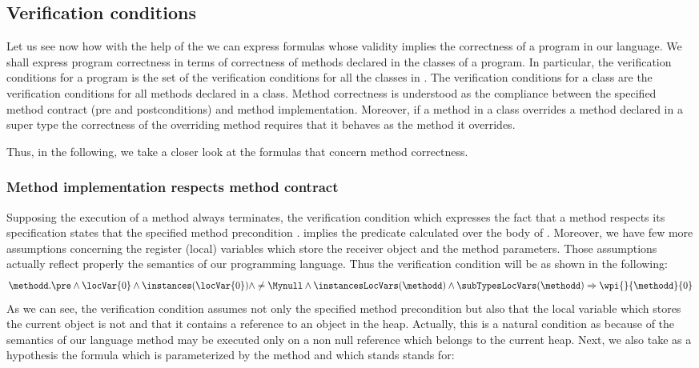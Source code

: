 

\subsection{Verification conditions} \label{wp:vcMeth}
Let us see now how with the help of the \wpName{} we can express 
formulas whose validity implies the correctness of a program in our language.
We shall express program correctness in terms of correctness of
methods declared in the classes of a program. 
In particular, the verification conditions  for a program  is the set of 
 the verification conditions for all the classes in \Program{}.
The verification conditions for a class are the verification conditions for
all methods declared in a class. 
Method correctness is understood 
as the compliance between the specified method contract (pre and
postconditions) and method implementation. 
Moreover, if a method in a class overrides a method declared in a super type
the correctness of the overriding method requires that it behaves as the
method it overrides. 

Thus, in the following, we take a closer look at
 the formulas that concern method correctness.

\subsubsection{Method implementation respects method contract}
Supposing the execution of a method always terminates, the verification condition which expresses the fact that 
 a method \methodd{}  respects its specification 
states that the specified method precondition  \methodd.\pre{} implies the
 predicate   calculated over the body of
 \methodd{}. Moreover,  we have few more assumptions concerning the register (local) variables
 which store the receiver object and the method parameters. Those assumptions
 actually reflect properly the semantics of our programming language. Thus the
 verification condition  will be as shown in the following: %
 $$ \methodd.\pre  \wedge \locVar{0} \wedge \instances( \locVar{0} ) \wedge
\neq \Mynull   
\wedge \instancesLocVars(\methodd)  \wedge \subTypesLocVars(\methodd)   \Rightarrow
 \wpi{}{\methodd}{0} $$
As we can see, the verification condition assumes not only the specified
 method precondition but also  that the local variable
 which stores the current object is not \Mynull{} and that it
 contains a reference to an object in the heap. Actually, this is
 a natural condition as because of the semantics of our language
 method may be executed only on a non null reference which belongs to the
 current heap. Next, we also take as  a hypothesis the formula  \instancesLocVars{} which is
parameterized by the method \methodd{} and which stands stands for:

